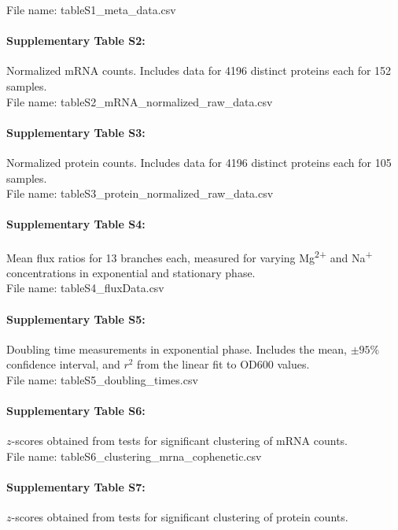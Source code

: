 \documentclass[a4paper]{article}
\begin{document}
\noindent File name: tableS1\_meta\_data.csv

\paragraph*{Supplementary Table S2:} Normalized mRNA counts. Includes data for 4196 distinct proteins each for 152 samples.\\

\noindent File name: tableS2\_mRNA\_normalized\_raw\_data.csv

\paragraph*{Supplementary Table S3:} Normalized protein counts. Includes data for 4196 distinct proteins each for 105 samples.\\

\noindent File name: tableS3\_protein\_normalized\_raw\_data.csv


\paragraph*{Supplementary Table S4:} Mean flux ratios for 13 branches each, measured for varying Mg\textsuperscript{2+} and Na\textsuperscript{+} concentrations in exponential and stationary phase.\\

\noindent File name: tableS4\_fluxData.csv


\paragraph*{Supplementary Table S5:} Doubling time measurements in exponential phase. Includes the mean, $\pm95\%$ confidence interval, and $r^2$ from the linear fit to OD600 values.\\

\noindent File name: tableS5\_doubling\_times.csv


\paragraph*{Supplementary Table S6:} $z$-scores obtained from tests for significant clustering of mRNA counts.\\

\noindent File name: tableS6\_clustering\_mrna\_cophenetic.csv

\paragraph*{Supplementary Table S7:} $z$-scores obtained from tests for significant clustering of protein counts.\\
\end{document}
